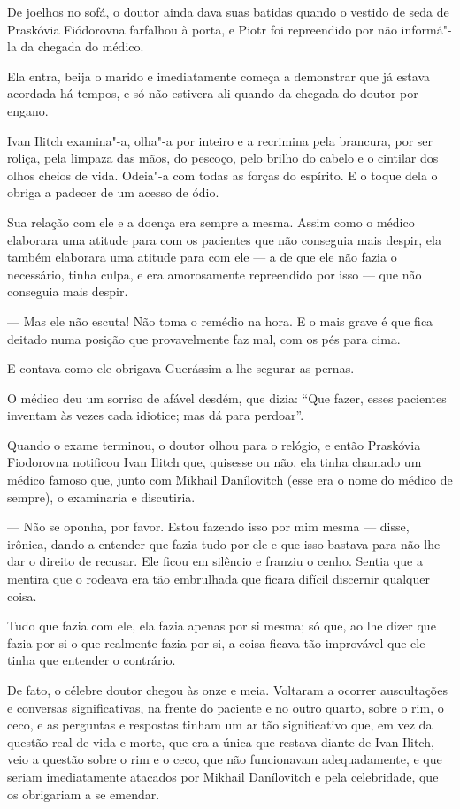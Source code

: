 De joelhos no sofá, o doutor ainda dava suas batidas quando o vestido de
seda de Praskóvia Fiódorovna farfalhou à porta, e Piotr foi repreendido
por não informá"-la da chegada do médico.

Ela entra, beija o marido e imediatamente começa a demonstrar que já
estava acordada há tempos, e só não estivera ali quando da chegada do
doutor por engano.

Ivan Ilitch examina"-a, olha"-a por inteiro e a recrimina pela brancura,
por ser roliça, pela limpaza das mãos, do pescoço, pelo brilho do cabelo
e o cintilar dos olhos cheios de vida. Odeia"-a com todas as forças do
espírito. E o toque dela o obriga a padecer de um acesso de ódio.

Sua relação com ele e a doença era sempre a mesma. Assim como o médico
elaborara uma atitude para com os pacientes que não conseguia mais
despir, ela também elaborara uma atitude para com ele --- a de que ele
não fazia o necessário, tinha culpa, e era amorosamente repreendido por
isso --- que não conseguia mais despir.

--- Mas ele não escuta! Não toma o remédio na hora. E o mais grave é que
fica deitado numa posição que provavelmente faz mal, com os pés para
cima.

E contava como ele obrigava Guerássim a lhe segurar as pernas.

O médico deu um sorriso de afável desdém, que dizia: ``Que fazer, esses
pacientes inventam às vezes cada idiotice; mas dá para perdoar''.

Quando o exame terminou, o doutor olhou para o relógio, e então
Praskóvia Fiodorovna notificou Ivan Ilitch que, quisesse ou não, ela
tinha chamado um médico famoso que, junto com Mikhail Danílovitch (esse
era o nome do médico de sempre), o examinaria e discutiria.

--- Não se oponha, por favor. Estou fazendo isso por mim mesma --- disse,
irônica, dando a entender que fazia tudo por ele e que isso bastava para
não lhe dar o direito de recusar. Ele ficou em silêncio e franziu o
cenho. Sentia que a mentira que o rodeava era tão embrulhada que ficara
difícil discernir qualquer coisa.

Tudo que fazia com ele, ela fazia apenas por si mesma; só que, ao lhe
dizer que fazia por si o que realmente fazia por si, a coisa ficava tão
improvável que ele tinha que entender o contrário.

De fato, o célebre doutor chegou às onze e meia. Voltaram a ocorrer
auscultações e conversas significativas, na frente do paciente e no
outro quarto, sobre o rim, o ceco, e as perguntas e respostas tinham um
ar tão significativo que, em vez da questão real de vida e morte, que
era a única que restava diante de Ivan Ilitch, veio a questão sobre o
rim e o ceco, que não funcionavam adequadamente, e que seriam
imediatamente atacados por Mikhail Danílovitch e pela celebridade, que
os obrigariam a se emendar.

